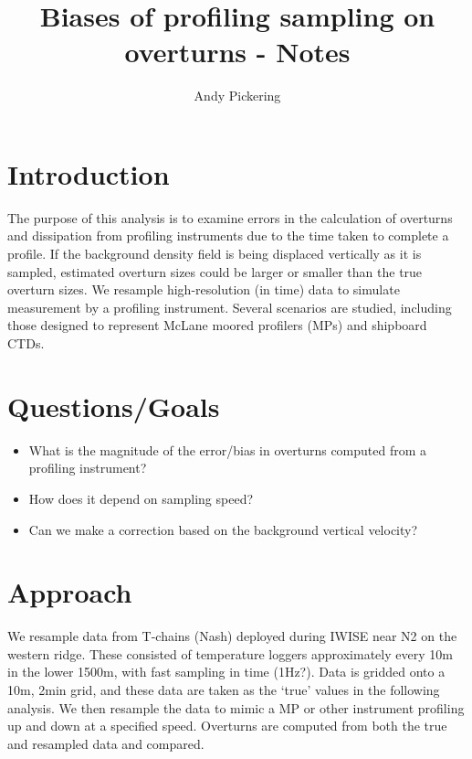 \documentclass[11pt]{article}
\title{Biases of profiling sampling on overturns - Notes}
\author{Andy Pickering}
\begin{document}
\maketitle

\tableofcontents
\newpage


\section{Introduction}

The purpose of this analysis is to examine errors in the calculation of overturns and dissipation from profiling instruments due to the time taken to complete a profile. If the background density field is being displaced vertically as it is sampled, estimated overturn sizes could be larger or smaller than the true overturn sizes. We resample high-resolution (in time) data to simulate measurement by a profiling instrument. Several scenarios are studied, including those designed to represent McLane moored profilers (MPs) and shipboard CTDs. 


\section{Questions/Goals}

\begin{itemize}
\item What is the magnitude of the error/bias in overturns computed from a profiling instrument?
\item How does it depend on sampling speed?
\item Can we make a correction based on the background vertical velocity?
\end{itemize}



\section{Approach}

We resample data from T-chains (Nash) deployed during IWISE near N2 on the western ridge. These consisted of temperature loggers approximately every 10m in the lower  1500m, with fast sampling in time (1Hz?). Data is gridded onto a 10m, 2min grid, and these data are taken as the `true' values in the following analysis. We then resample the data to mimic a MP or other instrument profiling up and down at a specified speed. Overturns are computed from both the true and resampled data and compared.
\end{document}

